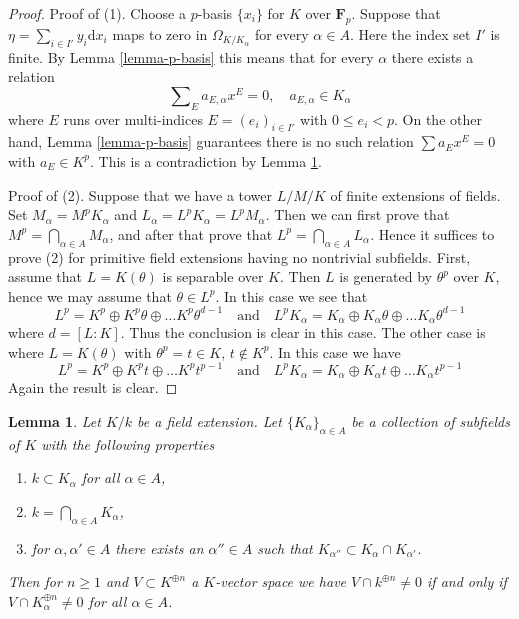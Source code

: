 \documentclass{amsart}
\theoremstyle{plain}
\newtheorem{lemma}[subsection]{Lemma}
\theoremstyle{definition}
\theoremstyle{remark}
\numberwithin{equation}{subsection}
\begin{document}
\begin{proof}
Proof of (1).
Choose a $p$-basis $\{x_i\}$ for $K$ over $\mathbf{F}_p$.
Suppose that $\eta = \sum_{i \in I'} y_i \text{d}x_i$ maps to zero in
$\Omega_{K/K_\alpha}$ for every $\alpha \in A$. Here the index set
$I'$ is finite. By Lemma \ref{lemma-p-basis}
this means that for every $\alpha$ there exists a relation
$$
\sum\nolimits_E a_{E, \alpha} x^E = 0,\quad a_{E, \alpha} \in K_\alpha
$$
where $E$ runs over multi-indices $E = (e_i)_{i \in I'}$ with
$0 \leq e_i < p$. On the other hand, Lemma \ref{lemma-p-basis}
guarantees there is no such relation $\sum a_E x^E = 0$ with
$a_E \in K^p$. This is a contradiction by
Lemma \ref{lemma-intersection-subfields-subspace}.

\medskip\noindent
Proof of (2). Suppose that we have a tower $L/M/K$
of finite extensions of fields. Set $M_\alpha = M^p K_\alpha$
and $L_\alpha = L^p K_\alpha = L^p M_\alpha$. Then we can first prove that
$M^p = \bigcap_{\alpha \in A} M_\alpha$, and after that prove
that $L^p = \bigcap_{\alpha \in A} L_\alpha$. Hence it suffices to
prove (2) for primitive field extensions having no nontrivial subfields.
First, assume that $L = K(\theta)$ is separable over $K$. Then
$L$ is generated by $\theta^p$ over $K$, hence we may assume that
$\theta \in L^p$. In this case we see that
$$
L^p = K^p \oplus K^p\theta \oplus \ldots K^p\theta^{d - 1}
\quad\text{and}\quad
L^pK_\alpha =
K_\alpha \oplus K_\alpha \theta \oplus \ldots K_\alpha\theta^{d - 1}
$$
where $d = [L : K]$. Thus the conclusion is clear in this case. The other
case is where $L = K(\theta)$ with $\theta^p = t \in K$, $t \not \in K^p$.
In this case we have
$$
L^p = K^p \oplus K^pt \oplus \ldots K^pt^{p - 1}
\quad\text{and}\quad
L^pK_\alpha =
K_\alpha \oplus K_\alpha t \oplus \ldots K_\alpha t^{p - 1}
$$
Again the result is clear.
\end{proof}


\begin{lemma}
\label{lemma-intersection-subfields-subspace}
Let $K/k$ be a field extension. Let $\{K_\alpha\}_{\alpha \in A}$
be a collection of subfields of $K$ with the following properties
\begin{enumerate}
\item $k \subset K_\alpha$ for all $\alpha \in A$,
\item $k = \bigcap_{\alpha \in A} K_\alpha$,
\item for $\alpha, \alpha' \in A$ there exists an $\alpha'' \in A$
such that $K_{\alpha''} \subset K_\alpha \cap K_{\alpha'}$.
\end{enumerate}
Then for $n \geq 1$ and $V \subset K^{\oplus n}$ a $K$-vector space
we have $V \cap k^{\oplus n} \not = 0$ if and only if
$V \cap K_\alpha^{\oplus n} \not = 0$ for all $\alpha \in A$.
\end{lemma}
\end{document}
